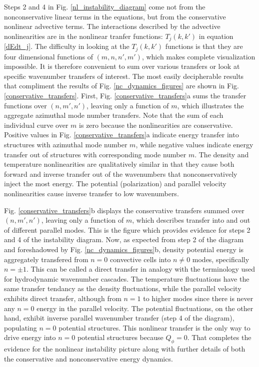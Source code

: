 \documentclass[twocolumn,showpacs,preprintnumbers,amsmath,amssymb]{revtex4}
\begin{document}
Steps 2 and 4 in Fig. \ref{nl_instability_diagram} come not from the nonconservative linear terms in the equations, but from the conservative nonlinear advective terms.
The interactions described by the advective nonlinearities are in the nonlinear tranfer functions: $T_{j}(k,k')$ in equation \ref{dEdt_j}.
The difficulty in looking at the $T_{j}(k,k')$ functions is that they are four dimensional functions of $(m,n,n',m')$, 
which makes complete visualization impossible. It is therefore convenient to sum over various transfers or look at specific wavenumber transfers of interest. The most easily decipherable
results that compliment the results of Fig. \ref{nc_dynamics_figures} are shown in Fig. \ref{conservative_transfers}. First, Fig. \ref{conservative_transfers}a sums the transfer functions over
$(n,m',n')$, leaving only a function of $m$, which illustrates the aggregate azimuthal mode
number transfers. Note that the sum of each individual curve over $m$ is zero because the nonlinearities are conservative. Positive values in Fig. \ref{conservative_transfers}a
indicate energy transfer into structures with azimuthal mode number $m$, while negative values indicate energy transfer out of structures with corresponding mode number $m$. 
The density and temperature nonlinearities
are qualitatively similar in that they cause both forward and inverse transfer out of the wavenumbers that nonconservatively inject the most energy. The potential (polarization) and parallel velocity 
nonlinearities cause inverse transfer to low wavenumbers. 

Fig. \ref{conservative_transfers}b displays the conservative transfers summed over $(n,m',n')$, leaving only a function of $m$, which describes transfer into and out
of different parallel modes. This is the figure which provides evidence for steps 2 and 4 of the instability diagram.
Now, as expected from step 2 of the diagram and foreshadowed by Fig. \ref{nc_dynamics_figures}b, 
density potential energy is aggregately transfered from $n=0$ convective cells into $n \ne 0$ modes, specifically $n = \pm 1$. This can be called a direct
transfer in analogy with the terminology used for hydrodynamic wavenumber cascades. The temperature fluctuations have the same transfer tendancy 
as the density fluctuations, while the parallel velocity exhibits direct transfer, although from $n=1$ to higher modes since there is never any $n=0$ energy in the parallel velocity.
The potential fluctuations, on the other hand, exhibit inverse parallel wavenumber transfer (step 4 of the diagram),
populating $n=0$ potential structures. This nonlinear transfer is the only way to drive energy into
$n=0$ potential structures because $Q_\phi=0$. That completes the evidence for the nonlinear instability picture along with further details of both the conservative and nonconservative energy dynamics.
\end{document}
